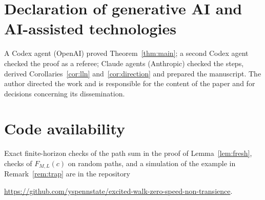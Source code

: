 \documentclass[11pt]{amsart}
\theoremstyle{remark}
\begin{document}
\section*{Declaration of generative AI and AI-assisted technologies}
A Codex agent (OpenAI) proved Theorem~\ref{thm:main}; a second Codex agent checked the proof as a referee; Claude
agents (Anthropic) checked the steps, derived Corollaries~\ref{cor:lln} and~\ref{cor:direction} and prepared the
manuscript. The author directed the work and is
responsible for the content of the paper and for decisions concerning its dissemination.

\section*{Code availability}
Exact finite-horizon checks of the path sum in the proof of Lemma~\ref{lem:fresh}, checks of $F_{M,L}(c)$ on
random paths, and a simulation of the example in Remark~\ref{rem:trap} are in the repository
\begin{center}\url{https://github.com/yspennstate/excited-walk-zero-speed-non-transience}.\end{center}
\end{document}
